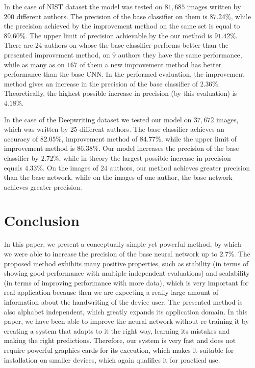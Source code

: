 \documentclass{article}
\begin{document}
In the case of NIST dataset the model was tested on $81,685$ images written by $200$ different authors. 
The precision of the base classifier on them is $87.24\%$, while the precision achieved by the improvement method on the same set is equal to $89.60\%$. 
The upper limit of precision achievable by the our method is $91.42\%$. 
There are $24$ authors on whose the base classifier performs better than the presented improvement method, on $9$ authors they have the same performance, 
while as many as on $167$ of them a new improvement method has better performance than the base CNN. 
In the performed evaluation, the improvement method gives an increase in the precision of the base classifier of $2.36\%$. 
Theoretically, the highest possible increase in precision (by this evaluation) is $4.18\%$. 

In the case of the Deepwriting dataset we tested our model on $37,672$ images, which was written by $25$ different authors. 
The base classifier achieves an accuracy of $82.05\%$, improvement method of $84.77\%$, while the upper limit of improvement method is $86.38\%$. 
Our model increases the precision of the base classifier by $2.72\%$, while in theory the largest possible increase in precision equals $4.33\%$. 
On the images of $24$ authors, our method achieves greater precision than the base network, while on the images of one author, the base network achieves greater precision. 

\section{Conclusion}

In this paper, we present a conceptually simple yet powerful method, by which we were able to increase the precision of the base neural network up to $2.7\%$. 
The proposed method exhibits many positive properties, such as stability 
(in terms of showing good performance with multiple independent evaluations) and scalability (in terms of improving performance with more data), 
which is very important for real application because then we are expecting a really large amount of information about the handwriting of the device user. 
The presented method is also alphabet independent, which greatly expands its application domain. 
In this paper, we have been able to improve the neural network without re-training it by creating a system that adapts to it the right way, 
learning its mistakes and making the right predictions. 
Therefore, our system is very fast and does not require powerful graphics cards for its execution, 
which makes it suitable for installation on smaller devices, which again qualifies it for practical use. 
\end{document}
